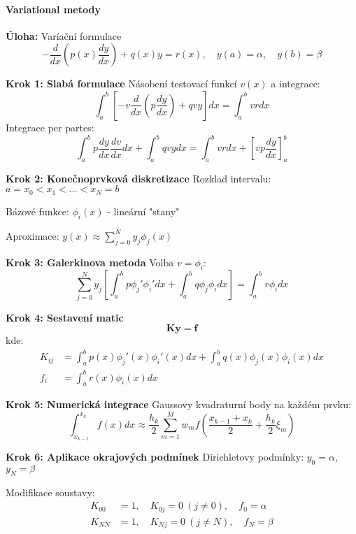 \paragraph{Variational metody}

\begin{example}
\label{ex:metoda-konecnych-prvku}

\noindent\textbf{Úloha:} Varíační formulace
\[
-\frac{d}{dx}\left(p(x)\frac{dy}{dx}\right) + q(x)y = r(x), \quad y(a) = \alpha, \quad y(b) = \beta
\]

\vspace{1.5\baselineskip}

\noindent\textbf{Krok 1: Slabá formulace}
Násobení testovací funkcí $v(x)$ a integrace:
\[
\int_a^b \left[-v\frac{d}{dx}\left(p\frac{dy}{dx}\right) + qvy\right] dx = \int_a^b vr dx
\]
Integrace per partes:
\[
\int_a^b p\frac{dy}{dx}\frac{dv}{dx} dx + \int_a^b qvy dx = \int_a^b vr dx + \left[vp\frac{dy}{dx}\right]_a^b
\]

\vspace{1\baselineskip}

\noindent\textbf{Krok 2: Konečnoprvková diskretizace}
Rozklad intervalu: $a = x_0 < x_1 < \dots < x_N = b$

Bázové funkce: $\phi_i(x)$ - lineární "stany"

Aproximace: $y(x) \approx \sum_{j=0}^N y_j \phi_j(x)$

\vspace{1\baselineskip}

\noindent\textbf{Krok 3: Galerkinova metoda}
Volba $v = \phi_i$:
\[
\sum_{j=0}^N y_j \left[\int_a^b p\phi_j'\phi_i' dx + \int_a^b q\phi_j\phi_i dx\right] = \int_a^b r\phi_i dx
\]

\vspace{1\baselineskip}

\noindent\textbf{Krok 4: Sestavení matic}
\[
\mathbf{K}\mathbf{y} = \mathbf{f}
\]
kde:
\begin{align*}
K_{ij} &= \int_a^b p(x)\phi_j'(x)\phi_i'(x) dx + \int_a^b q(x)\phi_j(x)\phi_i(x) dx \\
f_i &= \int_a^b r(x)\phi_i(x) dx
\end{align*}

\vspace{1\baselineskip}

\noindent\textbf{Krok 5: Numerická integrace}
Gaussovy kvadraturní body na každém prvku:
\[
\int_{x_{k-1}}^{x_k} f(x) dx \approx \frac{h_k}{2} \sum_{m=1}^M w_m f\left(\frac{x_{k-1} + x_k}{2} + \frac{h_k}{2}\xi_m\right)
\]

\vspace{1\baselineskip}

\noindent\textbf{Krok 6: Aplikace okrajových podmínek}
Dirichletovy podmínky: $y_0 = \alpha$, $y_N = \beta$

Modifikace soustavy:
\begin{align*}
K_{00} &= 1, \quad K_{0j} = 0 \ (j \neq 0), \quad f_0 = \alpha \\
K_{NN} &= 1, \quad K_{Nj} = 0 \ (j \neq N), \quad f_N = \beta
\end{align*}

\end{example}

